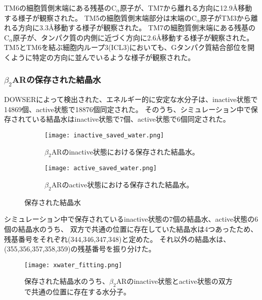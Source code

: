 \newpage

TM6の細胞質側末端にある残基の$\mathrm{C}_\alpha$原子が、TM7から離れる方向に12.9Å移動する様子が観察された。
TM5の細胞質側末端部分は末端の$\mathrm{C}_\alpha$原子がTM3から離れる方向に3.3Å移動する様子が観察された。
TM7の細胞質側末端にある残基の$\mathrm{C}_\alpha$原子が、タンパク質の内側に近づく方向に2.6Å移動する様子が観察された。
TM5とTM6を結ぶ細胞内ループ3(ICL3)においても、Gタンパク質結合部位を開くように特定の方向に並んでいるような様子が観察された。


\subsubsection{$\beta_2$ARの保存された結晶水}
DOWSERによって検出された、エネルギー的に安定な水分子は、inactive状態で14869個、active状態で18876個同定された。
そのうち、シミュレーション中で保存されている結晶水はinactive状態で7個、active状態で6個同定された。

\begin{figure}[htbp]
    \centering
    \begin{subfigure}{0.48\textwidth} %
      \centering
      \texttt{[image: inactive\_saved\_water.png]}
      \caption{$\beta_2$ARのinactive状態における保存された結晶水。}
      \label{fig:inactive_water}
    \end{subfigure}
    \hspace{0.02\textwidth} %
    \begin{subfigure}{0.48\textwidth}
      \centering
      \texttt{[image: active\_saved\_water.png]}
      \caption{$\beta_2$ARのactive状態における保存された結晶水。}
      \label{fig:active_water}
    \end{subfigure}
    \caption{保存された結晶水}
    \label{fig:water-all}
  \end{figure}

\newpage

シミュレーション中で保存されているinactive状態の7個の結晶水、active状態の6個の結晶水のうち、
双方で共通の位置に存在していた結晶水は4つあったため、残基番号をそれぞれ(344,346,347,348)と定めた。
それ以外の結晶水は、(355,356,357,358,359)の残基番号を振り分けた。

\begin{figure}[htbp]
  \centering
  \texttt{[image: xwater\_fitting.png]}
  \caption{保存された結晶水のうち、$\beta_2$ARのinactive状態とactive状態の双方で共通の位置に存在する水分子。}
  \label{fig:xwater_fitting}
\end{figure}

